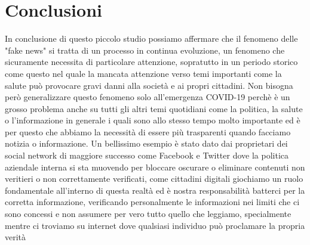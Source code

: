 \documentclass{article}
\begin{document}
\section{Conclusioni}
In conclusione di questo piccolo studio possiamo affermare che il fenomeno delle "fake news" si tratta di un processo in continua evoluzione, un fenomeno che sicuramente necessita di particolare attenzione, sopratutto in un periodo storico come questo nel quale la mancata attenzione verso temi importanti come la salute può provocare gravi danni alla società e ai propri cittadini. Non bisogna però generalizzare questo fenomeno solo all'emergenza COVID-19 perchè è un grosso problema anche su tutti gli altri temi quotidiani come la politica, la salute o l'informazione in generale i quali sono allo stesso tempo molto importante ed è per questo che abbiamo la necessità di essere più trasparenti quando facciamo notizia o informazione.
Un bellissimo esempio è stato dato dai proprietari dei social network di maggiore successo come Facebook e Twitter dove la politica aziendale interna si sta muovendo per bloccare oscurare o eliminare contenuti non veritieri o non correttamente verificati, come cittadini digitali giochiamo un ruolo fondamentale all'interno di questa realtà ed è nostra responsabilità batterci per la corretta informazione, verificando personalmente le informazioni nei limiti che ci sono concessi e non assumere per vero tutto quello che leggiamo, specialmente mentre ci troviamo su internet dove qualsiasi individuo può proclamare la propria verità
\printindex


\end{document}
